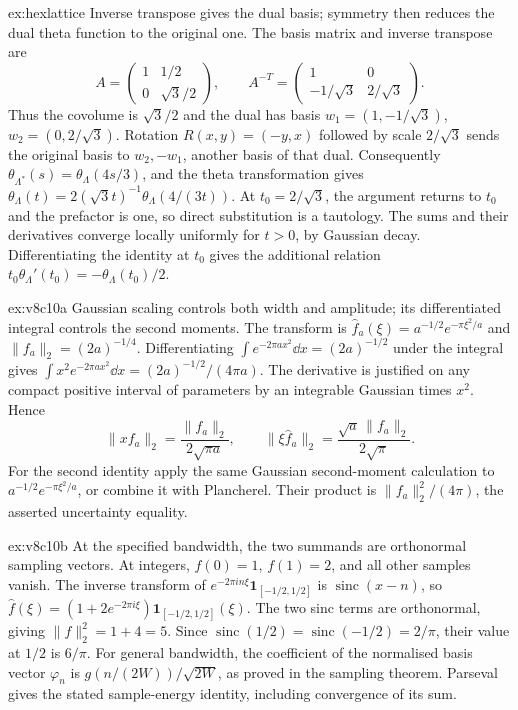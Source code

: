 \begin{solution}{ex:hexlattice}
\idea Inverse transpose gives the dual basis; symmetry then reduces the dual theta function to the original one.
\writeup The basis matrix and inverse transpose are
\[
A=\begin{pmatrix}1&1/2\\0&\sqrt3/2\end{pmatrix},\qquad
A^{-T}=\begin{pmatrix}1&0\\-1/\sqrt3&2/\sqrt3\end{pmatrix}.
\]
Thus the covolume is $\sqrt3/2$ and the dual has basis $w_1=(1,-1/\sqrt3)$, $w_2=(0,2/\sqrt3)$. Rotation $R(x,y)=(-y,x)$ followed by scale $2/\sqrt3$ sends the original basis to $w_2,-w_1$, another basis of that dual. Consequently $\theta_{\Lambda^*}(s)=\theta_\Lambda(4s/3)$, and the theta transformation gives $\theta_\Lambda(t)=2(\sqrt3t)^{-1}\theta_\Lambda(4/(3t))$.
At $t_0=2/\sqrt3$, the argument returns to $t_0$ and the prefactor is one, so direct substitution is a tautology. The sums and their derivatives converge locally uniformly for $t>0$, by Gaussian decay. Differentiating the identity at $t_0$ gives the additional relation $t_0\theta_\Lambda'(t_0)=-\theta_\Lambda(t_0)/2$.
\end{solution}

\begin{solution}{ex:v8c10a}
\idea Gaussian scaling controls both width and amplitude; its differentiated integral controls the second moments.
\writeup The transform is $\hat f_a(\xi)=a^{-1/2}e^{-\pi\xi^2/a}$ and $\|f_a\|_2=(2a)^{-1/4}$. Differentiating $\int e^{-2\pi ax^2}\dd x=(2a)^{-1/2}$ under the integral gives
$\int x^2e^{-2\pi ax^2}\dd x=(2a)^{-1/2}/(4\pi a)$.
The derivative is justified on any compact positive interval of parameters by an integrable Gaussian times $x^2$. Hence
\[
\|xf_a\|_2=\frac{\|f_a\|_2}{2\sqrt{\pi a}},\qquad
\|\xi\hat f_a\|_2=\frac{\sqrt a\,\|f_a\|_2}{2\sqrt\pi}.
\]
For the second identity apply the same Gaussian second-moment calculation to $a^{-1/2}e^{-\pi\xi^2/a}$, or combine it with Plancherel. Their product is $\|f_a\|_2^2/(4\pi)$, the asserted uncertainty equality.
\end{solution}

\begin{solution}{ex:v8c10b}
\idea At the specified bandwidth, the two summands are orthonormal sampling vectors.
\writeup At integers, $f(0)=1$, $f(1)=2$, and all other samples vanish. The inverse transform of $e^{-2\pi in\xi}\mathbf1_{[-1/2,1/2]}$ is $\operatorname{sinc}(x-n)$, so
$\hat f(\xi)=(1+2e^{-2\pi i\xi})\mathbf1_{[-1/2,1/2]}(\xi)$.
The two sinc terms are orthonormal, giving $\|f\|_2^2=1+4=5$. Since $\operatorname{sinc}(1/2)=\operatorname{sinc}(-1/2)=2/\pi$, their value at $1/2$ is $6/\pi$.
For general bandwidth, the coefficient of the normalised basis vector $\varphi_n$ is $g(n/(2W))/\sqrt{2W}$, as proved in the sampling theorem. Parseval gives the stated sample-energy identity, including convergence of its sum.
\end{solution}

